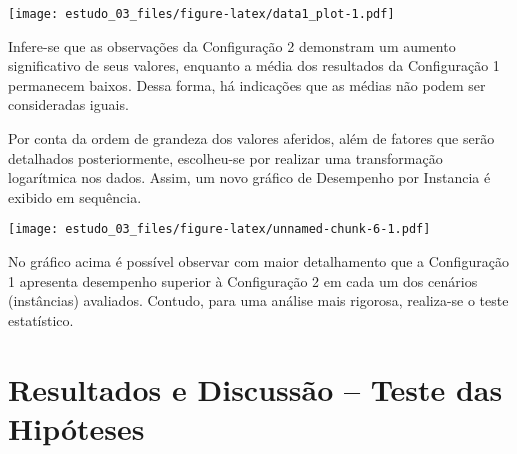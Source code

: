 \documentclass[
]{article}
\newenvironment{Shaded}{\begin{snugshade}}{\end{snugshade}}
\newcommand{\AttributeTok}[1]{\textcolor[rgb]{0.77,0.63,0.00}{#1}}
\newcommand{\CommentTok}[1]{\textcolor[rgb]{0.56,0.35,0.01}{\textit{#1}}}
\newcommand{\DecValTok}[1]{\textcolor[rgb]{0.00,0.00,0.81}{#1}}
\newcommand{\FloatTok}[1]{\textcolor[rgb]{0.00,0.00,0.81}{#1}}
\newcommand{\FunctionTok}[1]{\textcolor[rgb]{0.00,0.00,0.00}{#1}}
\newcommand{\NormalTok}[1]{#1}
\newcommand{\OtherTok}[1]{\textcolor[rgb]{0.56,0.35,0.01}{#1}}
\newcommand{\SpecialCharTok}[1]{\textcolor[rgb]{0.00,0.00,0.00}{#1}}
\begin{document}
\texttt{[image: estudo\_03\_files/figure-latex/data1\_plot-1.pdf]}

Infere-se que as observações da Configuração 2 demonstram um aumento
significativo de seus valores, enquanto a média dos resultados da
Configuração 1 permanecem baixos. Dessa forma, há indicações que as
médias não podem ser consideradas iguais.

Por conta da ordem de grandeza dos valores aferidos, além de fatores que
serão detalhados posteriormente, escolheu-se por realizar uma
transformação logarítmica nos dados. Assim, um novo gráfico de
Desempenho por Instancia é exibido em sequência.

\begin{Shaded}
\end{Shaded}

\texttt{[image: estudo\_03\_files/figure-latex/unnamed-chunk-6-1.pdf]}

No gráfico acima é possível observar com maior detalhamento que a
Configuração 1 apresenta desempenho superior à Configuração 2 em cada um
dos cenários (instâncias) avaliados. Contudo, para uma análise mais
rigorosa, realiza-se o teste estatístico.

\hypertarget{resultados-e-discussuxe3o-teste-das-hipuxf3teses}{%
\section{Resultados e Discussão -- Teste das
Hipóteses}\label{resultados-e-discussuxe3o-teste-das-hipuxf3teses}}
\end{document}
